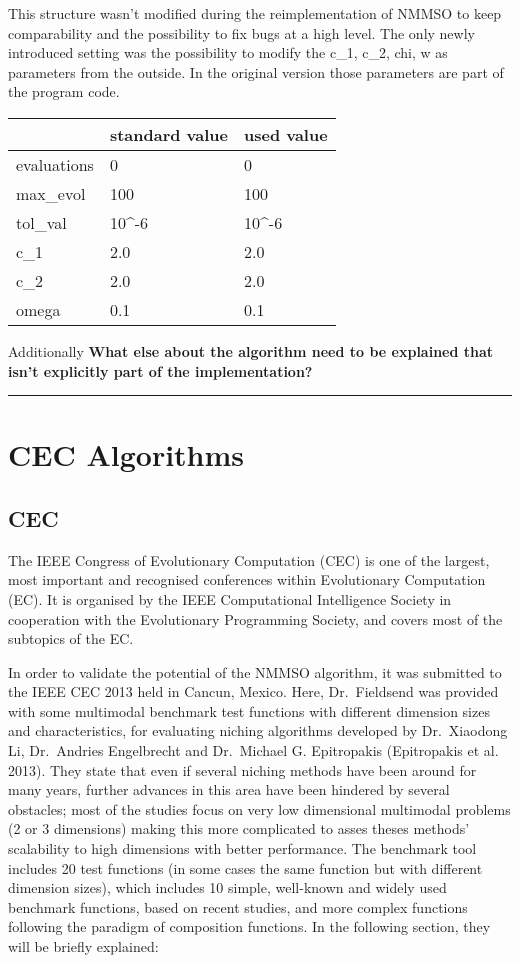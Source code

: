 \documentclass[12pt,a4paper]{article}
\begin{document}
This structure wasn't modified during the reimplementation of NMMSO to
keep comparability and the possibility to fix bugs at a high level. The
only newly introduced setting was the possibility to modify the c\_1,
c\_2, chi, w as parameters from the outside. In the original version
those parameters are part of the program code.

\begin{longtable}[c]{@{}lll@{}}
\toprule
& standard value & used value\tabularnewline
\midrule
\endhead
evaluations & 0 & 0\tabularnewline
max\_evol & 100 & 100\tabularnewline
tol\_val & 10\^{}-6 & 10\^{}-6\tabularnewline
c\_1 & 2.0 & 2.0\tabularnewline
c\_2 & 2.0 & 2.0\tabularnewline
omega & 0.1 & 0.1\tabularnewline
\bottomrule
\end{longtable}

Additionally \textbf{What else about the algorithm need to be explained
that isn't explicitly part of the implementation?}

\begin{center}\rule{0.5\linewidth}{\linethickness}\end{center}

\section{CEC Algorithms}\label{cec-algorithms}

\subsection{CEC}\label{cec}

The IEEE Congress of Evolutionary Computation (CEC) is one of the
largest, most important and recognised conferences within Evolutionary
Computation (EC). It is organised by the IEEE Computational Intelligence
Society in cooperation with the Evolutionary Programming Society, and
covers most of the subtopics of the EC.

In order to validate the potential of the NMMSO algorithm, it was
submitted to the IEEE CEC 2013 held in Cancun, Mexico. Here,
Dr.~Fieldsend was provided with some multimodal benchmark test functions
with different dimension sizes and characteristics, for evaluating
niching algorithms developed by Dr.~Xiaodong Li, Dr.~Andries Engelbrecht
and Dr.~Michael G. Epitropakis (Epitropakis et al. 2013). They state
that even if several niching methods have been around for many years,
further advances in this area have been hindered by several obstacles;
most of the studies focus on very low dimensional multimodal problems (2
or 3 dimensions) making this more complicated to asses theses methods'
scalability to high dimensions with better performance. The benchmark
tool includes 20 test functions (in some cases the same function but
with different dimension sizes), which includes 10 simple, well-known
and widely used benchmark functions, based on recent studies, and more
complex functions following the paradigm of composition functions. In
the following section, they will be briefly explained:
\end{document}
